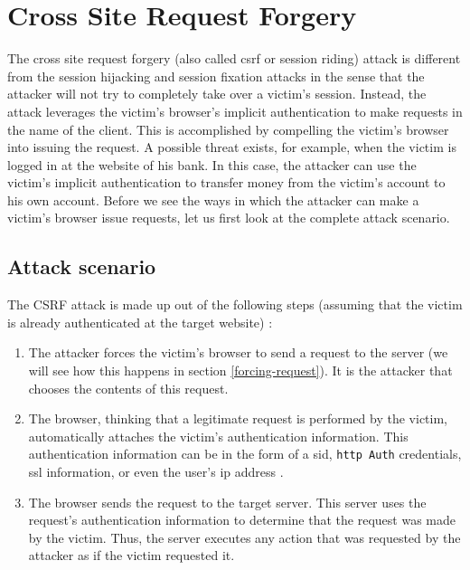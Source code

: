 \section{Cross Site Request Forgery}\label{csrf}

The cross site request forgery (also called \gls{csrf} or session riding) attack is different from the \gls{session hijacking} and \gls{session fixation} attacks in the sense that the attacker will not try to completely take over a victim's session. Instead, the attack leverages the victim's browser's implicit authentication to make requests in the name of the client. This is accomplished by compelling the victim's browser into issuing the request. A possible threat exists, for example, when the victim is logged in at the website of his bank. In this case, the attacker can use the victim's implicit authentication to transfer money from the victim's account to his own account. Before we see the ways in which the attacker can make a victim's browser issue requests, let us first look at the complete attack scenario.

\subsection{Attack scenario}

The CSRF attack is made up out of the following steps (assuming that the victim is already authenticated at the target website) \cite{Schreiber2004}:

\begin{enumerate}
	\item The attacker forces the victim's browser to send a request to the server (we will see how this happens in section \ref{forcing-request}). It is the attacker that chooses the contents of this request.
	\item The browser, thinking that a legitimate request is performed by the victim, automatically attaches the victim's authentication information. This authentication information can be in the form of a \gls{sid}, \texttt{\gls{http} Auth} credentials, \gls{ssl} information, or even the user's \gls{ip} address \cite{Johns2006b,Zeller2008}.
	\item The browser sends the request to the target server. This server uses the request's authentication information to determine that the request was made by the victim. Thus, the server executes any action that was requested by the attacker as if the victim requested it.
\end{enumerate}

